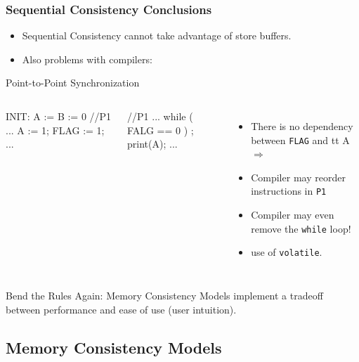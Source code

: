 \documentclass{beamer}
\renewcommand{\emph}[1]{\textcolor{structure}{#1}}
\newcommand{\emp}[1]{\textcolor{DikuRed}{ #1}}
\begin{document}
\begin{frame}[fragile,t]
\frametitle{Sequential Consistency Conclusions}

\begin{itemize}
    \item \emp{Sequential Consistency cannot take advantage of store buffers.}\medskip
    \item \emp{Also problems with compilers:}
\end{itemize}

\begin{block}{Point-to-Point Synchronization}
\begin{columns}
\begin{colorcode}[fontsize=\scriptsize]
        INIT: A := B := 0
//P1
...
A    := 1;
FLAG := 1;
...
\end{colorcode} 
\begin{colorcode}[fontsize=\scriptsize]

//P1
...
while ( FALG == 0 ) ;
print(A);
...
\end{colorcode} 
\begin{itemize}
    \item There is no dependency between {\tt FLAG} and {tt A} $\Rightarrow$\smallskip
    \item \emp{Compiler may reorder instructions in {\tt P1}}
    \item \alert{Compiler may even remove the {\tt while} loop!}
    \item use of \emph{\tt volatile}.
\end  {itemize}
\end{columns}
\end{block}
\bigskip

\emph{Bend the Rules Again: Memory Consistency Models} implement a 
tradeoff between performance and ease of use (user intuition).

\end{frame}

\subsection{Memory Consistency Models}
\end{document}
